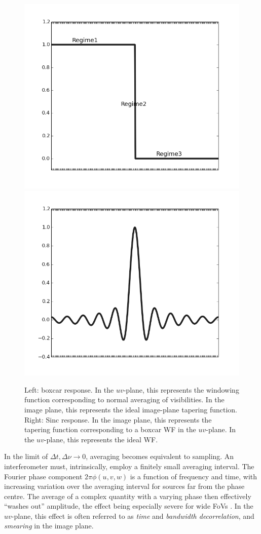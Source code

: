 \documentclass[useAMS,usenatbib]{mn2e}
\begin{document}
\begin{figure}
\includegraphics[width=.4\textwidth]{./Figures/idealIPRgrey.png}%
\includegraphics[width=.4\textwidth]{./Figures/idealsincgrey.png}\\
\caption{Left: boxcar response. In the $uv$-plane, this represents the windowing function corresponding to normal
averaging of visibilities. In the image plane, this represents the ideal image-plane tapering function. Right: 
Sinc response. In the image plane, this represents the tapering function corresponding to a boxcar WF in 
the $uv$-plane. In the $uv$-plane, this represents the ideal WF.}
\label{fig:idealWF}
\end{figure}

In the limit of $\Delta t,\Delta \nu \rightarrow 0$, averaging becomes equivalent to sampling. 
An interferometer must, intrinsically, employ a finitely small averaging interval. The Fourier phase 
component $2\pi\phi(u,v,w)$ is a function of frequency and time, with increasing variation over the averaging interval 
for sources far from the phase centre. The average of a complex quantity with a varying phase then effectively ``washes out'' 
amplitude, the effect being especially severe for wide FoVs \citep[for an extensive discussion, see][]{bregman2012system}. In the
$uv$-plane, this
effect is often referred to as \emph{time} and \emph{bandwidth decorrelation}, and \emph{smearing} in the image plane.
\end{document}
